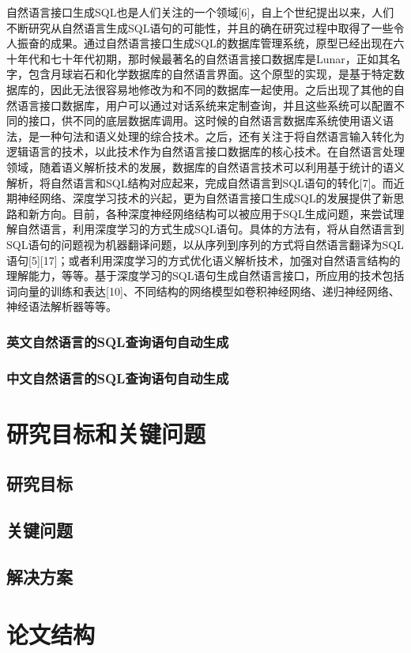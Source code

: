 自然语言接口生成SQL也是人们关注的一个领域[6]，自上个世纪提出以来，人们不断研究从自然语言生成SQL语句的可能性，并且的确在研究过程中取得了一些令人振奋的成果。通过自然语言接口生成SQL的数据库管理系统，原型已经出现在六十年代和七十年代初期，那时候最著名的自然语言接口数据库是Lunar，正如其名字，包含月球岩石和化学数据库的自然语言界面。这个原型的实现，是基于特定数据库的，因此无法很容易地修改为和不同的数据库一起使用。之后出现了其他的自然语言接口数据库，用户可以通过对话系统来定制查询，并且这些系统可以配置不同的接口，供不同的底层数据库调用。这时候的自然语言数据库系统使用语义语法，是一种句法和语义处理的综合技术。之后，还有关注于将自然语言输入转化为逻辑语言的技术，以此技术作为自然语言接口数据库的核心技术。在自然语言处理领域，随着语义解析技术的发展，数据库的自然语言技术可以利用基于统计的语义解析，将自然语言和SQL结构对应起来，完成自然语言到SQL语句的转化[7]。而近期神经网络、深度学习技术的兴起，更为自然语言接口生成SQL的发展提供了新思路和新方向。目前，各种深度神经网络结构可以被应用于SQL生成问题，来尝试理解自然语言，利用深度学习的方式生成SQL语句。具体的方法有，将从自然语言到SQL语句的问题视为机器翻译问题，以从序列到序列的方式将自然语言翻译为SQL语句[5][17]；或者利用深度学习的方式优化语义解析技术，加强对自然语言结构的理解能力，等等。基于深度学习的SQL语句生成自然语言接口，所应用的技术包括词向量的训练和表达[10]、不同结构的网络模型如卷积神经网络、递归神经网络、神经语法解析器等等。


\label{intro:interactionsql}
\subsubsection{英文自然语言的SQL查询语句自动生成}
\label{intro:enl2sql}
\subsubsection{中文自然语言的SQL查询语句自动生成}
\label{intro:cnl2sql}
\section{研究目标和关键问题}
\label{intro:targetquestion}
\subsection{研究目标}
\label{intro:target}
\subsection{关键问题}
\label{intro:question}
\subsection{解决方案}
\label{intro:solution}
\section{论文结构}
\label{intro:structure}